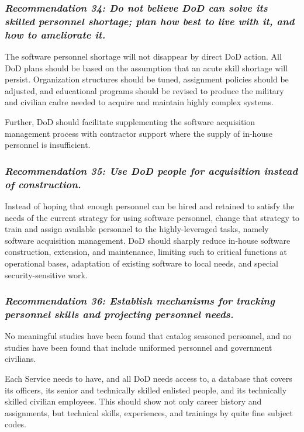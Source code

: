 \documentclass[12pt,final]{article}
\begin{document}
\subsubsection*{\textit{Recommendation 34: Do not believe DoD can solve its
skilled personnel shortage; plan how best to live with it, and how to
ameliorate it.}}

The software personnel shortage will not disappear by direct DoD action. All
DoD plans should be based on the assumption that an acute skill shortage will
persist.  Organization structures should be tuned, assignment policies should
be adjusted, and educational programs should be revised to produce the military
and civilian cadre needed to acquire and maintain highly complex systems.

Further, DoD should facilitate supplementing the software acquisition
management process with contractor support where the supply of in-house
personnel is insufficient.

\subsubsection*{\textit{Recommendation 35: Use DoD people for acquisition
instead of construction.}}

Instead of hoping that enough personnel can be hired and retained to satisfy
the needs of the current strategy for using software personnel, change that
strategy to train and assign available personnel to the highly-leveraged tasks,
namely software acquisition management. DoD should sharply reduce in-house
software construction, extension, and maintenance, limiting such to critical
functions at operational bases, adaptation of existing software to local needs,
and special security-sensitive work.

\subsubsection*{\textit{Recommendation 36: Establish mechanisms for tracking
personnel skills and projecting personnel needs.}}

No meaningful studies have been found that catalog seasoned personnel, and no
studies have been found that include uniformed personnel and government
civilians.

Each Service needs to have, and all DoD needs access to, a database that covers
its officers, its senior and technically skilled enlisted people, and its
technically skilled civilian employees. This should show not only career
history and assignments, but technical skills, experiences, and trainings by
quite fine subject codes.
\end{document}
